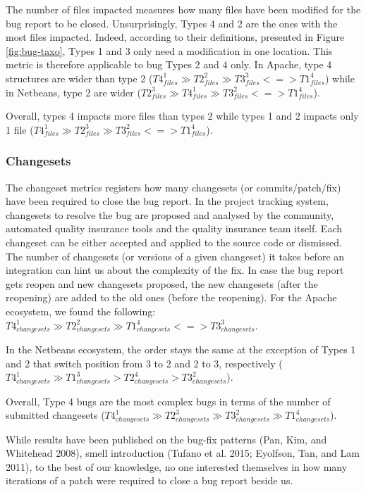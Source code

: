 \documentclass[natbib]{svjour3}
\begin{document}
The number of files impacted measures how many files have been modified
for the bug report to be closed. Unsurprisingly, Types 4 and 2 are the
ones with the most files impacted. Indeed, according to their
definitions, presented in Figure \ref{fig:bug-taxo}, Types 1 and 3 only
need a modification in one location. This metric is therefore applicable
to bug Types 2 and 4 only. In Apache, type 4 structures are wider than
type 2
(\(T4_{files}^1 \gg T2_{files}^2 \gg T3_{files}^3 < = > T1_{files}^4\))
while in Netbeans, type 2 are wider
(\(T2_{files}^3 \gg T4_{files}^1 \gg T3_{files}^2 < = > T1_{files}^4\)).

Overall, types 4 impacts more files than types 2 while types 1 and 2
impacts only 1 file
(\(T4_{files}^1 \gg T2_{files}^3 \gg T3_{files}^2 < = > T1_{files}^4\)).

\subsubsection{Changesets}\label{changesets}

The changeset metrics registers how many changesets (or
commits/patch/fix) have been required to close the bug report. In the
project tracking system, changesets to resolve the bug are proposed and
analysed by the community, automated quality insurance tools and the
quality insurance team itself. Each changeset can be either accepted and
applied to the source code or dismissed. The number of changesets (or
versions of a given changeset) it takes before an integration can hint
us about the complexity of the fix. In case the bug report gets reopen
and new changesets proposed, the new changesets (after the reopening)
are added to the old ones (before the reopening). For the Apache
ecosystem, we found the following:
\(T4_{changesets}^1 \gg T2_{changesets}^2 \gg T1_{changesets}^4 <=> T3_{changesets}^3\).

In the Netbeans ecosystem, the order stays the same at the exception of
Types 1 and 2 that switch position from 3 to 2 and 2 to 3, respectively
(\(T4_{changesets}^1 \gg T1_{changesets}^3 > T2_{changesets}^4 > T3_{changesets}^2\)).

Overall, Type 4 bugs are the most complex bugs in terms of the number of
submitted changesets
(\(T4_{changesets}^1 \gg T2_{changesets}^3 \gg T3_{changesets}^2 \gg T1_{changesets}^4\)).

While results have been published on the bug-fix patterns (Pan, Kim, and
Whitehead 2008), smell introduction (Tufano et al. 2015; Eyolfson, Tan,
and Lam 2011), to the best of our knowledge, no one interested
themselves in how many iterations of a patch were required to close a
bug report beside us.
\end{document}

